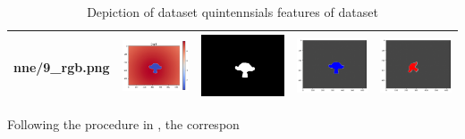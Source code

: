 \begin{table}[htb]
\begin{tabular}{ccccc}
nne/9_rgb.png}} & \multicolumn{1}{c}{\includegraphics[scale=0.2]{images/suzanne/depth.png}} & \multicolumn{1}{c|}{\includegraphics[scale=0.12]{images/suzanne/9_mask.png}} & \multicolumn{1}{c}{\includegraphics[scale=0.2]{images/suzanne/output.png}} & \multicolumn{1}{c}{\includegraphics[scale=0.2]{images/suzanne/output_1.png}} \\ \hline
    \end{tabular}
    \caption{Depiction of dataset quintennsials features of dataset}
    \label{table:suzanne}
\end{table}



Following the procedure in \cite{hartley2003multiple}, the correspon